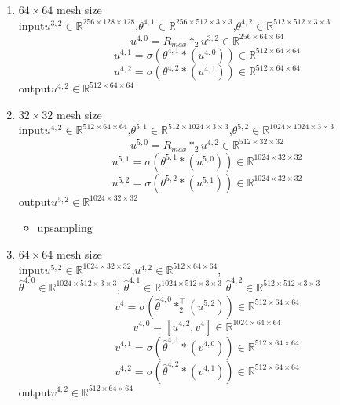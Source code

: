 \begin{enumerate}
	\item $64\times 64$ mesh size\\
	input\quad $u^{3,2}\in \mathbb{R}^{256\times 128\times 128}$,\quad $\theta^{4,1} \in \mathbb{R}^{256\times 512\times 3\times 3}$,\quad $\theta^{4,2} \in \mathbb{R}^{512\times 512\times 3\times 3}$
	$$u^{4,0}=R_{max}*_{2}u^{3,2} \in \mathbb{R}^{256\times 64\times 64} $$
	$$u^{4,1}=\sigma (\theta^{4,1} \ast (u^{4,0}))\in \mathbb{R}^{512\times 64\times 64}$$
	$$u^{4,2}=\sigma (\theta^{4,2} \ast (u^{4,1}))\in \mathbb{R}^{512\times 64\times 64}$$
	output\quad $u^{4,2} \in \mathbb{R}^{512\times 64\times 64}$
	
	\item $32\times 32$ mesh size\\
	input\quad $u^{4,2}\in \mathbb{R}^{512\times 64\times 64}$,\quad $\theta^{5,1} \in \mathbb{R}^{512\times 1024\times 3\times 3}$,\quad $\theta^{5,2} \in \mathbb{R}^{1024\times 1024\times 3\times 3}$
	$$u^{5,0}=R_{max}*_{2}u^{4,2} \in \mathbb{R}^{512\times 32\times 32} $$
	$$u^{5,1}=\sigma (\theta^{5,1} \ast (u^{5,0}))\in \mathbb{R}^{1024\times 32\times 32}$$
	$$u^{5,2}=\sigma (\theta^{5,2} \ast (u^{5,1}))\in \mathbb{R}^{1024\times 32\times 32}$$
	output\quad $u^{5,2} \in \mathbb{R}^{1024\times 32\times 32}$
	
	\begin{itemize}
		\item upsampling
	\end{itemize}
	\item $64\times 64$ mesh size\\
	input\quad $u^{5,2} \in \mathbb{R}^{1024\times 32\times 32}$,\quad$u^{4,2}\in \mathbb{R}^{512\times 64\times 64}$,\\
	$\hat{\theta}^{4,0} \in \mathbb{R}^{1024\times 512\times 3\times 3}$,\quad
	$\hat{\theta}^{4,1} \in \mathbb{R}^{1024\times 512\times 3\times 3}$\quad
	$\hat{\theta}^{4,2} \in \mathbb{R}^{512\times 512\times 3\times 3}$
	$$v^{4}= \sigma(\hat{\theta}^{4,0} \ast^{\top}_2 (u^{5,2}))\in \mathbb{R}^{512\times 64\times 64}$$
	$$v^{4,0}=[u^{4,2},v^{4}]\in \mathbb{R}^{1024\times 64\times 64}$$
	$$v^{4,1}= \sigma(\hat{\theta}^{4,1} \ast (v^{4,0}))\in \mathbb{R}^{512\times 64\times 64}$$
	$$v^{4,2}= \sigma(\hat{\theta}^{4,2} \ast (v^{4,1}))\in \mathbb{R}^{512\times 64\times 64}$$
	output\quad $v^{4,2} \in \mathbb{R}^{512\times 64\times 64}$
	

\end{enumerate}
